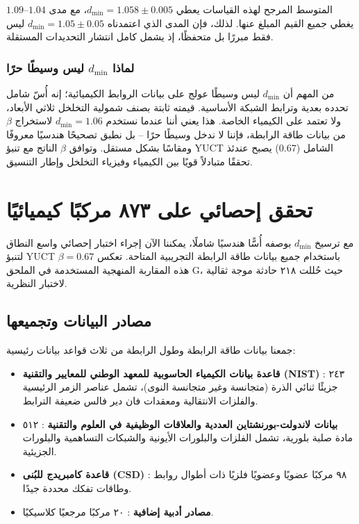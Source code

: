 \documentclass[12pt,a4paper]{article}
\theoremstyle{remark}
\begin{document}
	المتوسط المرجح لهذه القياسات يعطي \(d_{\text{min}} = 1.058 \pm 0.005\)، مع مدى \(1.04\)–\(1.09\) يغطي جميع القيم المبلغ عنها. لذلك، فإن المدى الذي اعتمدناه \(d_{\text{min}} = 1.05 \pm 0.05\) ليس فقط مبررًا بل متحفظًا، إذ يشمل كامل انتشار التحديدات المستقلة.
	
	\subsubsection{لماذا \(d_{\text{min}}\) ليس وسيطًا حرًا}
	
	من المهم أن \(d_{\text{min}}\) ليس وسيطًا عولج على بيانات الروابط الكيميائية؛ إنه أُسّ شامل تحدده بعدية وترابط الشبكة الأساسية. قيمته ثابتة بصنف شمولية التخلخل ثلاثي الأبعاد، ولا تعتمد على الكيمياء الخاصة. هذا يعني أننا عندما نستخدم \(d_{\text{min}} = 1.06\) لاستخراج \(\beta\) من بيانات طاقة الرابطة، فإننا لا ندخل وسيطًا حرًا – بل نطبق تصحيحًا هندسيًا معروفًا ومقاسًا بشكل مستقل. وتوافق \(\beta\) الناتج مع تنبؤ YUCT الشامل (0.67) يصبح عندئذ تحققًا متبادلاً قويًا بين الكيمياء وفيزياء التخلخل وإطار التنسيق.
	
	\section{تحقق إحصائي على ٨٧٣ مركبًا كيميائيًا}
	\label{sec:statistical_validation}
	
	مع ترسيخ \(d_{\text{min}}\) بوصفه أُسًّا هندسيًا شاملًا، يمكننا الآن إجراء اختبار إحصائي واسع النطاق لتنبؤ YUCT \(\beta = 0.67\) باستخدام جميع بيانات طاقة الرابطة التجريبية المتاحة. تعكس هذه المقاربة المنهجية المستخدمة في الملحق G، حيث حُللت ٢١٨ حادثة موجة ثقالية لاختبار النظرية.
	
	\subsection{مصادر البيانات وتجميعها}
	
	جمعنا بيانات طاقة الرابطة وطول الرابطة من ثلاث قواعد بيانات رئيسية:
	
	\begin{itemize}
		\item \textbf{قاعدة بيانات الكيمياء الحاسوبية للمعهد الوطني للمعايير والتقنية (NIST)} \cite{NIST2025}: ٢٤٣ جزيئًا ثنائي الذرة (متجانسة وغير متجانسة النوى)، تشمل عناصر الزمر الرئيسية والفلزات الانتقالية ومعقدات فان دير فالس ضعيفة الترابط.
		\item \textbf{بيانات لاندولت-بورنشتاين العددية والعلاقات الوظيفية في العلوم والتقنية} \cite{LB2000}: ٥١٢ مادة صلبة بلورية، تشمل الفلزات والبلورات الأيونية والشبكات التساهمية والبلورات الجزيئية.
		\item \textbf{قاعدة كامبريدج للبُنى (CSD)} \cite{CSD2024}: ٩٨ مركبًا عضويًا وعضويًا فلزيًا ذات أطوال روابط وطاقات تفكك محددة جيدًا.
		\item \textbf{مصادر أدبية إضافية} \cite{Kittel2005, Pauling1960}: ٢٠ مركبًا مرجعيًا كلاسيكيًا.
	\end{itemize}
	
\end{document}
